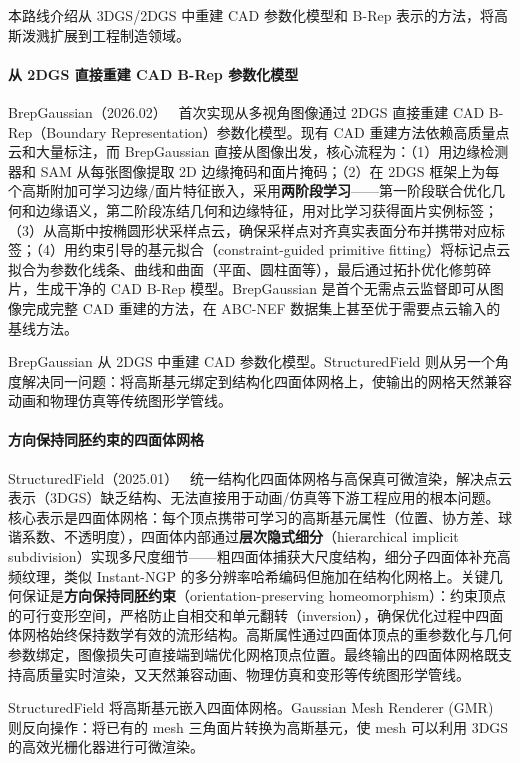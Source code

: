 本路线介绍从 3DGS/2DGS 中重建 CAD 参数化模型和 B-Rep 表示的方法，将高斯泼溅扩展到工程制造领域。

\paragraph{从 2DGS 直接重建 CAD B-Rep 参数化模型}

BrepGaussian（2026.02）~\cite{2602_21105} 首次实现从多视角图像通过 2DGS 直接重建 CAD B-Rep（Boundary Representation）参数化模型。现有 CAD 重建方法依赖高质量点云和大量标注，而 BrepGaussian 直接从图像出发，核心流程为：（1）用边缘检测器和 SAM 从每张图像提取 2D 边缘掩码和面片掩码；（2）在 2DGS 框架上为每个高斯附加可学习边缘/面片特征嵌入，采用\textbf{两阶段学习}——第一阶段联合优化几何和边缘语义，第二阶段冻结几何和边缘特征，用对比学习获得面片实例标签；（3）从高斯中按椭圆形状采样点云，确保采样点对齐真实表面分布并携带对应标签；（4）用约束引导的基元拟合（constraint-guided primitive fitting）将标记点云拟合为参数化线条、曲线和曲面（平面、圆柱面等），最后通过拓扑优化修剪碎片，生成干净的 CAD B-Rep 模型。BrepGaussian 是首个无需点云监督即可从图像完成完整 CAD 重建的方法，在 ABC-NEF 数据集上甚至优于需要点云输入的基线方法。

BrepGaussian 从 2DGS 中重建 CAD 参数化模型。StructuredField 则从另一个角度解决同一问题：将高斯基元绑定到结构化四面体网格上，使输出的网格天然兼容动画和物理仿真等传统图形学管线。

\paragraph{方向保持同胚约束的四面体网格}

StructuredField（2025.01）~\cite{2501_18152} 统一结构化四面体网格与高保真可微渲染，解决点云表示（3DGS）缺乏结构、无法直接用于动画/仿真等下游工程应用的根本问题。核心表示是四面体网格：每个顶点携带可学习的高斯基元属性（位置、协方差、球谐系数、不透明度），四面体内部通过\textbf{层次隐式细分}（hierarchical implicit subdivision）实现多尺度细节——粗四面体捕获大尺度结构，细分子四面体补充高频纹理，类似 Instant-NGP 的多分辨率哈希编码但施加在结构化网格上。关键几何保证是\textbf{方向保持同胚约束}（orientation-preserving homeomorphism）：约束顶点的可行变形空间，严格防止自相交和单元翻转（inversion），确保优化过程中四面体网格始终保持数学有效的流形结构。高斯属性通过四面体顶点的重参数化与几何参数绑定，图像损失可直接端到端优化网格顶点位置。最终输出的四面体网格既支持高质量实时渲染，又天然兼容动画、物理仿真和变形等传统图形学管线。

StructuredField 将高斯基元嵌入四面体网格。Gaussian Mesh Renderer (GMR) 则反向操作：将已有的 mesh 三角面片转换为高斯基元，使 mesh 可以利用 3DGS 的高效光栅化器进行可微渲染。

